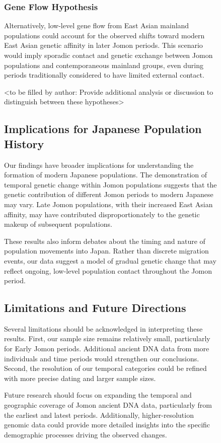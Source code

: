 \documentclass[12pt]{article}
\begin{document}
\begin{figure}[h]
\subsubsection{Gene Flow Hypothesis}
Alternatively, low-level gene flow from East Asian mainland populations could account for the observed shifts toward modern East Asian genetic affinity in later Jomon periods. This scenario would imply sporadic contact and genetic exchange between Jomon populations and contemporaneous mainland groups, even during periods traditionally considered to have limited external contact.

<to be filled by author: Provide additional analysis or discussion to distinguish between these hypotheses>

\subsection{Implications for Japanese Population History}

Our findings have broader implications for understanding the formation of modern Japanese populations. The demonstration of temporal genetic change within Jomon populations suggests that the genetic contribution of different Jomon periods to modern Japanese may vary. Late Jomon populations, with their increased East Asian affinity, may have contributed disproportionately to the genetic makeup of subsequent populations.

These results also inform debates about the timing and nature of population movements into Japan. Rather than discrete migration events, our data suggest a model of gradual genetic change that may reflect ongoing, low-level population contact throughout the Jomon period.

\subsection{Limitations and Future Directions}

Several limitations should be acknowledged in interpreting these results. First, our sample size remains relatively small, particularly for Early Jomon periods. Additional ancient DNA data from more individuals and time periods would strengthen our conclusions. Second, the resolution of our temporal categories could be refined with more precise dating and larger sample sizes.

Future research should focus on expanding the temporal and geographic coverage of Jomon ancient DNA data, particularly from the earliest and latest periods. Additionally, higher-resolution genomic data could provide more detailed insights into the specific demographic processes driving the observed changes.


\end{figure}
\end{document}
